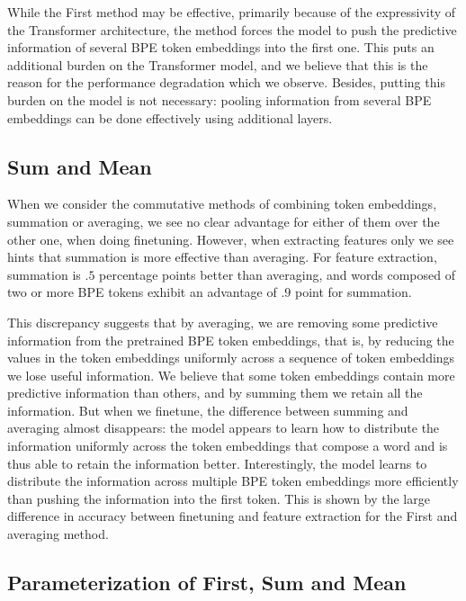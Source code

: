 \documentclass[11pt]{article}
\begin{document}
                             While the First method may be effective,
     primarily because of the expressivity of the Transformer
     architecture, the method forces the model to push the predictive
     information of several BPE token embeddings into the first one. This
     puts an additional burden on the Transformer model, and we believe that this
     is the reason for the performance degradation which we observe.
     Besides, putting this burden on the model is not necessary: pooling
     information from several BPE embeddings can be done effectively using additional layers.


    \subsection{Sum and Mean}
                When we consider the commutative methods of combining
     token embeddings, summation or averaging, we see no clear advantage
     for either of them over the other one, when doing
     finetuning. However, when extracting features only we see hints
     that summation is more effective than averaging. For feature
     extraction, summation is $.5$ percentage points better than
     averaging, and words composed of two or more BPE tokens exhibit
     an advantage of $.9$ point for summation.
    
                This discrepancy suggests that by averaging, we are
     removing some predictive information from the pretrained BPE
     token embeddings, that is, by reducing the values in the token embeddings
     uniformly across a sequence of token embeddings we lose useful
     information.
        We believe that some token embeddings contain more predictive
     information than others, and by summing them we retain all the
     information.
                         But when we finetune, the difference between
     summing and averaging almost disappears: the model appears to
     learn how to distribute the information uniformly across the
     token embeddings that compose a word and is thus able to retain the
     information better. Interestingly, the model learns to distribute
     the information across multiple BPE token embeddings more
     efficiently than pushing the information into the first
     token. This is shown by the large difference in accuracy between
     finetuning and feature extraction for the First and averaging
     method.


    \subsection{Parameterization of First, Sum and Mean}
\end{document}
